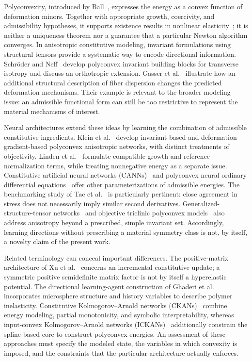 Polyconvexity, introduced by Ball~\cite{ball1977}, expresses the energy as a convex function of deformation minors. Together with appropriate growth, coercivity, and admissibility hypotheses, it supports existence results in nonlinear elasticity~\cite{Ciarlet1988}; it is neither a uniqueness theorem nor a guarantee that a particular Newton algorithm converges. In anisotropic constitutive modeling, invariant formulations using structural tensors provide a systematic way to encode directional information. Schr\"oder and Neff~\cite{SchroderNeff2003} develop polyconvex invariant building blocks for transverse isotropy and discuss an orthotropic extension. Gasser et al.~\cite{Gasser2006} illustrate how an additional structural description of fiber dispersion changes the predicted deformation mechanisms. Their example is relevant to the broader modeling issue: an admissible functional form can still be too restrictive to represent the material mechanisms of interest.

Neural architectures extend these ideas by learning the combination of admissible constitutive ingredients. Klein et al.~\cite{klein2022} develop invariant-based and deformation-gradient-based polyconvex anisotropic networks, with distinct treatments of objectivity. Linden et al.~\cite{linden2023} formulate compatible growth and reference-normalization terms, while treating nonnegative energy as a separate issue. Constitutive artificial neural networks (CANNs)~\cite{Linka2023} and polyconvex neural ordinary differential equations~\cite{Tac2022} offer other parameterizations of admissible energies. The benchmarking study of Tac et al.~\cite{Tac2024} is particularly pertinent: close agreement in stress does not necessarily imply similar second derivatives. Generalized-structure-tensor networks~\cite{Kalina2024} and objective triclinic polyconvex models~\cite{klein2026} also address anisotropy beyond a prescribed, simple invariant set. Accordingly, learning directions without prescribing a material symmetry class is not, by itself, a novelty claim of the present work.

Related terminology can conceal important differences. The positive-matrix architecture of Xu et al.~\cite{Xu2021} concerns an incremental constitutive update; a symmetric positive semidefinite matrix factor is not by itself a hyperelastic potential. The directional learning-agent construction of Ghaderi et al.~\cite{Ghaderi2020} incorporates microsphere structure and history variables to describe polymer inelasticity. Constitutive Kolmogorov--Arnold networks (CKANs)~\cite{Abdolazizi2025} combine energy modeling, partial monotonicity, and symbolic interpretability, whereas input-convex Kolmogorov--Arnold networks (ICKANs)~\cite{thakolkaran2025} additionally constrain the spline-based core to construct polyconvex energies. An assessment of these approaches must specify the modeled state, the variables in which convexity is imposed, and the constraints that the particular architecture actually enforces.


